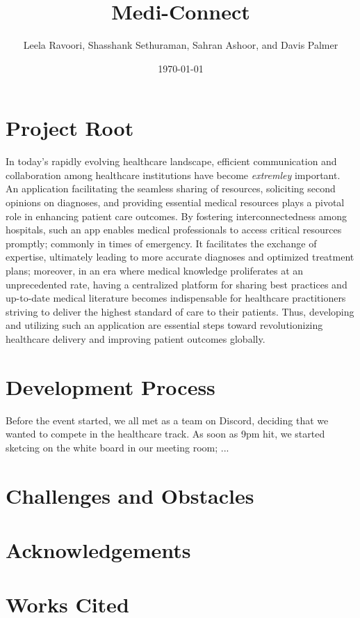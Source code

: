 \documentclass{article}
\title{Medi-Connect}
\author{Leela Ravoori, Shasshank Sethuraman, Sahran Ashoor, and Davis Palmer}
\date{\today}
\begin{document}
\maketitle

\section*{Project Root}

In today's rapidly evolving healthcare landscape, efficient communication and collaboration among healthcare institutions have become \emph{extremley} important. An application facilitating the seamless sharing of resources, soliciting second opinions on diagnoses, and providing essential medical resources plays a pivotal role in enhancing patient care outcomes. By fostering interconnectedness among hospitals, such an app enables medical professionals to access critical resources promptly; commonly in times of emergency. It facilitates the exchange of expertise, ultimately leading to more accurate diagnoses and optimized treatment plans; moreover, in an era where medical knowledge proliferates at an unprecedented rate, having a centralized platform for sharing best practices and up-to-date medical literature becomes indispensable for healthcare practitioners striving to deliver the highest standard of care to their patients. Thus, developing and utilizing such an application are essential steps toward revolutionizing healthcare delivery and improving patient outcomes globally.

\section*{Development Process}
Before the event started, we all met as a team on Discord, deciding that we wanted to compete in the healthcare track. As soon as 9pm hit, we started sketcing on the white board in our meeting room; ...

\section*{Challenges and Obstacles}

\section*{Acknowledgements}

\newpage
\section*{Works Cited}
\end{document}
